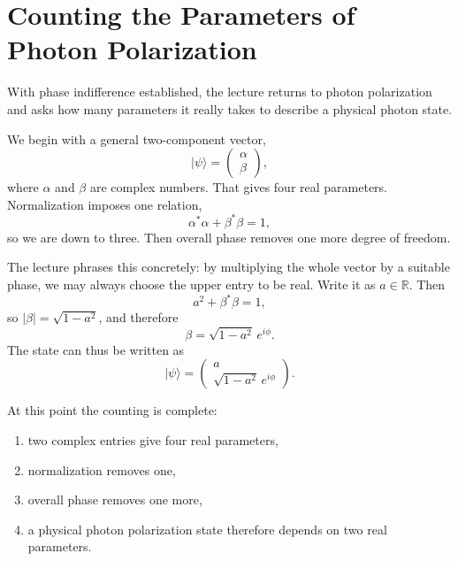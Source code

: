 \section{Counting the Parameters of Photon Polarization}

With phase indifference established, the lecture returns to photon polarization and asks how many parameters it really takes to describe a physical photon state.

We begin with a general two-component vector,
\begin{equation}
|\psi\rangle=
\begin{pmatrix}
\alpha\\
\beta
\end{pmatrix},
\end{equation}
where $\alpha$ and $\beta$ are complex numbers. That gives four real parameters. Normalization imposes one relation,
\begin{equation}
\alpha^*\alpha+\beta^*\beta=1,
\end{equation}
so we are down to three. Then overall phase removes one more degree of freedom.

The lecture phrases this concretely: by multiplying the whole vector by a suitable phase, we may always choose the upper entry to be real. Write it as $a\in\mathbb R$. Then
\begin{equation}
a^2+\beta^*\beta=1,
\end{equation}
so $|\beta|=\sqrt{1-a^2}$, and therefore
\begin{equation}
\beta=\sqrt{1-a^2}\,e^{i\phi}.
\end{equation}
The state can thus be written as
\begin{equation}
|\psi\rangle=
\begin{pmatrix}
a\\
\sqrt{1-a^2}\,e^{i\phi}
\end{pmatrix}.
\end{equation}

At this point the counting is complete:
\begin{enumerate}
\item two complex entries give four real parameters,
\item normalization removes one,
\item overall phase removes one more,
\item a physical photon polarization state therefore depends on two real parameters.
\end{enumerate}

